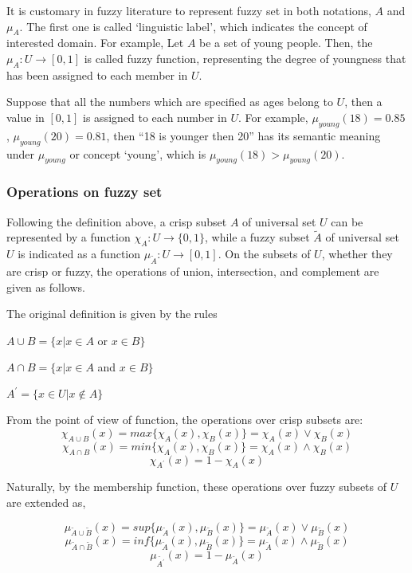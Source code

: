 It is customary in fuzzy literature to represent fuzzy set in both notations, $A$ and $\mu_A$. The first one is called `linguistic label', which indicates the concept of interested domain. For example, Let $A$ be a set of young people. Then, the $\mu_A : U \rightarrow [0,1]$ is called fuzzy function, representing the degree of youngness that has been assigned to each member in $U$.  

Suppose that all the numbers which are specified as ages belong to $U$, then a value in $[0,1]$ is assigned to each number in $U$. For example, $\mu_{young}(18)=0.85$, $\mu_{young}(20)=0.81$, then ``18 is younger then 20'' has its semantic meaning under $\mu_{young}$ or concept `young', which is $\mu_{young}(18) > \mu_{young}(20)$.

\subsubsection{Operations on fuzzy set}
\label{sec:OperationOnFuzzySet}
Following the definition above, a crisp subset $A$ of universal set $U$ can be represented by a function $\chi_A : U \rightarrow \{0,1\}$, while a fuzzy subset $\tilde{A}$ of universal set $U$ is indicated as a function $\mu_{\tilde{A}} : U \rightarrow [0,1]$. On the subsets of $U$, whether they are crisp or fuzzy, the operations of union, intersection, and complement are given as follows.

The original definition is given by the rules
\begin{center}
$A \cup B = \{x|x \in A$ or $x \in B\}$

$A \cap B = \{x|x \in A$ and $x \in B\}$

$A^{'} = \{x \in U | x \notin A\}$
\end{center}

From the point of view of function, the operations over crisp subsets are:
\[\chi_{A \cup B}(x) = max\{\chi_A(x),\chi_B(x)\} = \chi_A(x) \vee \chi_B(x)\] 
\[\chi_{A \cap B}(x) = min\{\chi_A(x),\chi_B(x)\} = \chi_A(x) \wedge \chi_B(x)\]
\[\chi_{A^{'}}(x) = 1 - \chi_A(x)\] 

Naturally, by the membership function, these operations over fuzzy subsets of $U$ are extended as,

\[\mu_{\tilde{A} \cup \tilde{B}}(x) = sup\{\mu_{\tilde{A}}(x),\mu_{\tilde{B}}(x)\}=\mu_{\tilde{A}}(x) \vee \mu_{\tilde{B}}(x)\]
\[\mu_{\tilde{A} \cap \tilde{B}}(x) = inf\{\mu_{\tilde{A}}(x),\mu_{\tilde{B}}(x)\}=\mu_{\tilde{A}}(x) \wedge \mu_{\tilde{B}}(x)\]
\[\mu_{\tilde{A^{'}}}(x) = 1 - \mu_{\tilde{A}}(x)\]

